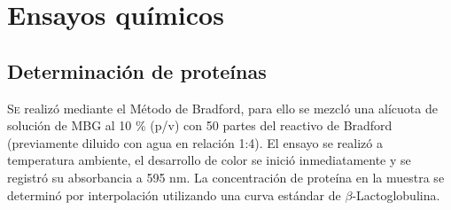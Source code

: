 \chapter{Ensayos químicos}\label{anexo:CurvasCalibracion}
\section{Determinación de proteínas}
\lettrine{S}{e} realizó mediante el Método de Bradford, para ello se mezcló una alícuota de solución de MBG al 10 \% (p/v) con 50 partes del reactivo de Bradford (previamente diluido con agua en relación 1:4). El ensayo se realizó a temperatura ambiente, el desarrollo de color se inició inmediatamente y se registró su absorbancia a 595 nm. La concentración de proteína en la muestra se determinó por interpolación utilizando una curva estándar de $\beta$-Lactoglobulina.


